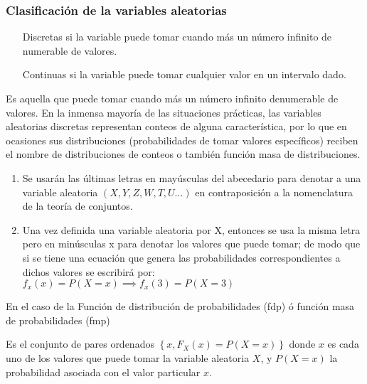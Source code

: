 \subsubsection{Clasificación de la variables aleatorias}

\begin{itemize}
    \item[Discretas] si la variable puede tomar cuando más un
        número infinito de numerable de valores.
    \item[Continuas] si la variable puede tomar cualquier valor en un intervalo dado.
\end{itemize}

\begin{definition}
    Es aquella que puede tomar cuando más un número infinito
    denumerable de valores. En la inmensa mayoría de
    las situaciones prácticas, las variables aleatorias
    discretas representan conteos de alguna
    característica, por lo que en ocasiones sus
    distribuciones (probabilidades de tomar valores
    específicos) reciben el nombre de distribuciones de
    conteos o también función masa de distribuciones.
\end{definition}


\begin{notation}
    \begin{enumerate}
        \item Se usarán las últimas letras en mayúsculas del
              abecedario para denotar a una variable aleatoria $(X,Y, Z,
                  W, T, U\dots)$ en contraposición a la nomenclatura de la
              teoría de conjuntos.
        \item Una vez definida una variable aleatoria por X, entonces se
              usa la misma letra pero en minúsculas x para denotar los
              valores que puede tomar; de modo que si se tiene una
              ecuación que genera las probabilidades correspondientes
              a dichos valores se escribirá por:$f_x(x)=P(X=x)\implies f_x(3)=P(X=3)$
    \end{enumerate}
\end{notation}


En el caso de la Función de distribución de probabilidades (fdp)
ó función masa de probabilidades (fmp)
\begin{definition}
    Es el conjunto de pares ordenados $\left\{ x, F_X(x)=P(X= x)\right\}$
    donde $x$ es cada uno de los valores que puede tomar la variable
    aleatoria $X$, y $P(X=x)$ la probabilidad asociada con el valor particular $x$.
\end{definition}

